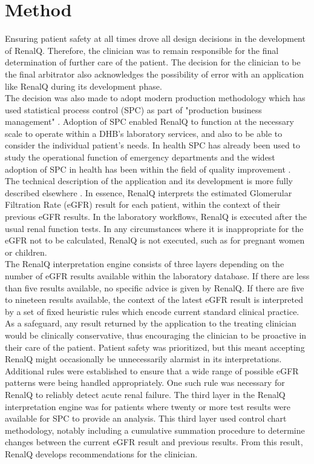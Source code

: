 \documentclass[11pt,a4paper]{article}
\begin{document}
\section{Method}
Ensuring patient safety at all times drove all design decisions in the development of RenalQ. Therefore, the clinician was to remain responsible for the final determination of further care of the patient.   The decision for the clinician to be the final arbitrator also acknowledges the possibility of error with an application like RenalQ during its development phase. \\

The decision was also made to adopt modern production methodology which has used statistical process control (SPC) as part of "production business management" \citep{rosemann2015six, cheng2015run, epprecht2015statistical}. Adoption of SPC enabled RenalQ to function at the necessary scale to operate within a DHB's laboratory services, and also to  be able to consider the individual patient's needs. In health SPC has already been used to study the operational function of emergency departments \citep{pimentel2015statistical} and the widest adoption of SPC in health has been within the field of quality improvement \citep{provost2011health}.\\

The technical description of the application and its development is more fully described elsewhere \citep{GodfreyEtAl2014KidneyPaper}. In essence, RenalQ interprets the estimated Glomerular Filtration Rate (eGFR) result for each patient, within the context of their previous eGFR results. In the laboratory workflows, RenalQ is executed after the usual renal function tests. In any circumstances where it is inappropriate for the eGFR not to be calculated, RenalQ is not executed, such as for pregnant women or children. \\

The RenalQ interpretation engine consists of three layers depending on the number of eGFR results available within the laboratory database. If there are less than five results available, no specific advice is given by RenalQ. If there are five to nineteen  results available, the context of the latest eGFR result is interpreted by a set of fixed heuristic rules which encode current standard clinical practice. As a safeguard, any result returned by the application to the treating clinician would be clinically conservative, thus encouraging the  clinician to be proactive in their care of the patient. Patient safety was prioritized, but this meant accepting RenalQ might occasionally be unnecessarily alarmist in its interpretations. Additional rules were established to ensure that a wide range of possible eGFR patterns were being handled appropriately.  One such rule was necessary for RenalQ to reliably detect acute renal failure. The third layer in the RenalQ interpretation engine was for patients where twenty  or more test results were available for SPC to provide an analysis. This third layer used control chart methodology, notably including a cumulative summation procedure to determine changes between the current eGFR result and previous results. From this result, RenalQ develops recommendations for the clinician.  
\end{document}
